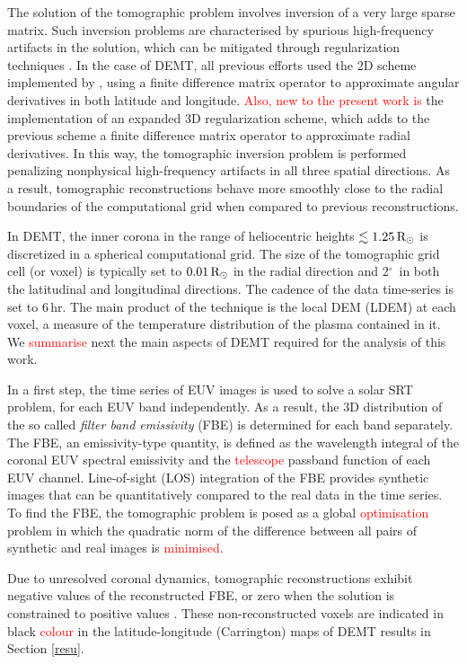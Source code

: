 \documentclass[namedreferences]{solarphysics}
\def\edit#1{\textcolor{Red}{#1}}
\renewcommand{\deg}{$^\circ$}
\newcommand{\mrsun}{{\rm R_\odot}}
\begin{document}
\begin{article}
{The solution of the tomographic problem involves {inversion of} a very large sparse matrix. Such inversion problems are characterised by spurious {high-fre\-quen\-cy} artifacts in the solution, which can be mitigated through {regularization} techniques \citep{frazin_2000}. In the case of DEMT, all previous efforts used the 2D scheme implemented by \citet{frazin_2009}, using a finite difference matrix operator to approximate angular derivatives in both latitude and longitude. \edit{Also, new to the present work is} the implementation of an expanded 3D regularization scheme, which adds to the previous scheme a finite difference matrix operator to approximate radial derivatives. In this way, the tomographic inversion problem is performed penalizing nonphysical high-frequency artifacts in all three spatial directions. As a result, tomographic reconstructions behave more smoothly close to the radial boundaries of the computational grid {when compared to previous reconstructions.}}

{In DEMT, the inner corona in the range of heliocentric heights $\lesssim 1.25\,\mrsun$ is discretized in a spherical computational grid. The size of the tomographic grid cell (or voxel) is typically set to $0.01\,\mrsun$ in the radial direction and 2\deg\ in both the latitudinal and longitudinal directions. The cadence of the data time-series is set to 6\,hr. The main product of the technique is the local DEM (LDEM) at each voxel, a measure of the temperature distribution of the plasma contained in it. We \edit{summarise} next the main aspects of DEMT required for the analysis of this work.}

In a first step, the time series of EUV images is used to solve a solar SRT problem, for each EUV band independently. As a result, the 3D distribution of the so called \emph{filter band emissivity} (FBE) is determined for each band separately. The FBE, {an emissivity-type quantity}, is defined as the wavelength integral of the coronal EUV spectral emissivity and the \edit{telescope} passband function of each EUV channel. Line-of-sight (LOS) integration of the FBE provides synthetic images that can be quantitatively compared to the real data in the time series. To find the FBE, the tomographic problem is posed as a global \edit{optimisation} problem in which the quadratic norm of the difference between all {pairs of synthetic and real images is \edit{minimised}.}

Due to unresolved coronal dynamics, tomographic reconstructions exhibit negative values of the reconstructed FBE, or zero when the solution is constrained to positive values \citep{frazin_2000,frazin_2009}. These non-reconstructed voxels are indicated {in black \edit{colour} in the latitude-longitude (Carrington) maps of DEMT} results in Section \ref{resu}.


\end{article}
\end{document}
